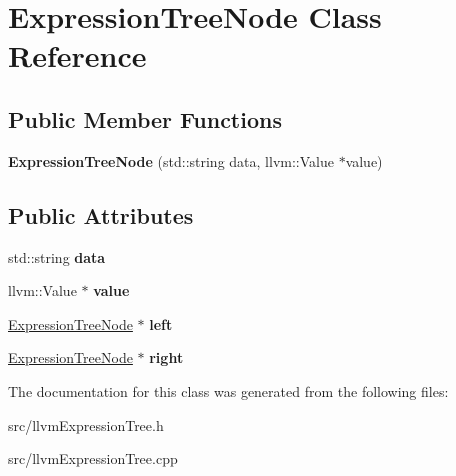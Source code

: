 \hypertarget{classExpressionTreeNode}{}\section{Expression\+Tree\+Node Class Reference}
\label{classExpressionTreeNode}
\subsection*{Public Member Functions}
\begin{DoxyCompactItemize}
\item 
{\bfseries Expression\+Tree\+Node} (std\+::string data, llvm\+::\+Value $\ast$value)\hypertarget{classExpressionTreeNode_ae12bfa041b98f470fe1951dc2d9340bf}{}\label{classExpressionTreeNode_ae12bfa041b98f470fe1951dc2d9340bf}

\end{DoxyCompactItemize}
\subsection*{Public Attributes}
\begin{DoxyCompactItemize}
\item 
std\+::string {\bfseries data}\hypertarget{classExpressionTreeNode_a5d822f0d7f5a484932f91eea04969afd}{}\label{classExpressionTreeNode_a5d822f0d7f5a484932f91eea04969afd}

\item 
llvm\+::\+Value $\ast$ {\bfseries value}\hypertarget{classExpressionTreeNode_a4a18903ca92423a2b86f157e3028d5a2}{}\label{classExpressionTreeNode_a4a18903ca92423a2b86f157e3028d5a2}

\item 
\hyperlink{classExpressionTreeNode}{Expression\+Tree\+Node} $\ast$ {\bfseries left}\hypertarget{classExpressionTreeNode_a6d40c98fb5aac9a0fb6b19831a0bbc1a}{}\label{classExpressionTreeNode_a6d40c98fb5aac9a0fb6b19831a0bbc1a}

\item 
\hyperlink{classExpressionTreeNode}{Expression\+Tree\+Node} $\ast$ {\bfseries right}\hypertarget{classExpressionTreeNode_a8ff25d9d06cc598ea9ef197a00de6386}{}\label{classExpressionTreeNode_a8ff25d9d06cc598ea9ef197a00de6386}

\end{DoxyCompactItemize}


The documentation for this class was generated from the following files\+:\begin{DoxyCompactItemize}
\item 
src/llvm\+Expression\+Tree.\+h\item 
src/llvm\+Expression\+Tree.\+cpp\end{DoxyCompactItemize}
